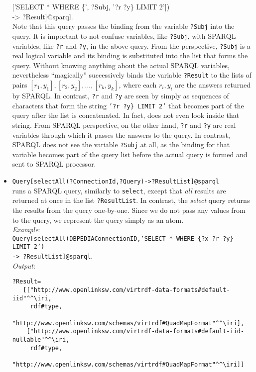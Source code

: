 \begin{itemize}
{    ['SELECT * WHERE \{', ?Subj, '?r ?y\} LIMIT 2'])
    \\ \hspace*{12mm}
    -> ?Result]@\bs{}sparql.}
  \\
  Note that this query passes the binding from the variable
  \texttt{?Subj} into the query. 
  It is important to not confuse \ERGO variables, like \texttt{?Subj}, with
  SPARQL variables, like \texttt{?r} and \texttt{?y}, in the above query.
  From the \ERGO perspective, \texttt{?Subj} is a real logical variable 
  and its binding is substituted into the
  list that forms the query. Without knowing anything about the actual SPARQL
  variables, \ERGO nevertheless ``magically'' successively binds the variable
  \texttt{?Result}  to the lists of pairs
  $[r_1,y_1],[r_2,y_2],...,[r_k,y_k]$, where each $r_i,y_i$ are
  the answers returned by SPARQL.
  In contrast, \texttt{?r} and \texttt{?y} are
  seen by \ERGO simply as sequences of characters that form the string
  \texttt{'?r ?y\} LIMIT 2'} that becomes part of the query after the list
  is concatenated. In fact, \ERGO does not even look inside that string.
  From SPARQL perspective, on the other hand, \texttt{?r}
  and \texttt{?y} are real variables through which it passes the answers to
  the query. In contrast, SPARQL does not see the \ERGO
  variable \texttt{?Subj} at all, as the binding for
  that variable becomes part of the query list before the actual query is
  formed and sent to SPARQL processor.
  
\item \texttt{Query[selectAll(?ConnectionId,?Query)->?ResultList]@\bs{}sparql}
  \\
  runs a SPARQL query, similarly to \texttt{select}, 
  except that \emph{all} results are returned at once
  in the list \texttt{?ResultList}. In contrast, the \emph{select} query
  returns the results from the query one-by-one. 
  Since we do not pass any values from \ERGO to the query, we represent the
  query simply as an atom.
  \\
   \emph{Example}: \\
  \texttt{Query[selectAll(DBPEDIAConnectionID,'SELECT * WHERE \{?x ?r ?y\} LIMIT 2')
    \\\hspace*{12mm}
    -> ?ResultList]@\bs{}sparql}.
   \\
\emph{Output}:
\begin{verbatim}
?Result=
   [["http://www.openlinksw.com/virtrdf-data-formats#default-iid"^^\iri,
     rdf#type,
     "http://www.openlinksw.com/schemas/virtrdf#QuadMapFormat"^^\iri],
    ["http://www.openlinksw.com/virtrdf-data-formats#default-iid-nullable"^^\iri,
     rdf#type,
     "http://www.openlinksw.com/schemas/virtrdf#QuadMapFormat"^^\iri]]
\end{verbatim}
  


\end{itemize}
